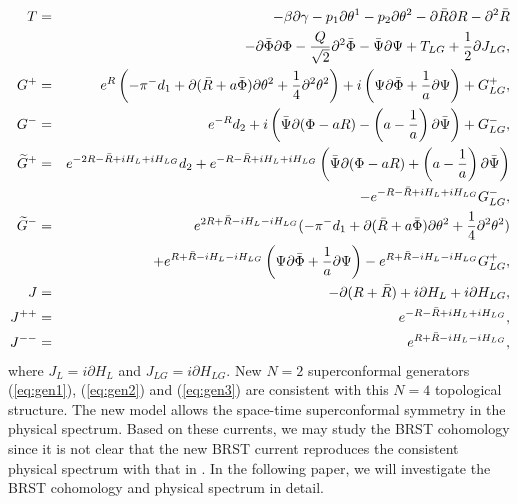 \documentclass[a4paper,12pt]{article}
\begin{document}
\begin{eqnarray}
T
&=&-\beta\partial\gamma-p_1\partial\theta^1
-p_2\partial\theta^2-\partial\bar R\partial R
-\partial^2\bar R \nonumber\\
&&\hspace{10mm}
-\partial\bar\Phi\partial\Phi
-\frac{Q}{\sqrt{2}}\partial^2\bar\Phi
-\bar\Psi\partial\Psi+T_{LG}+\frac{1}{2}\partial J_{LG},\nonumber\\
G^+&=&
e^R\left(
-\pi^-d_1+\partial(\bar R+a\bar\Phi)\partial\theta^2
+\frac{1}{4}\partial^2\theta^2\right)
+i\left(\Psi
\partial\bar\Phi+\frac{1}{a}\partial\Psi\right)+G^+_{LG},
\nonumber\\
G^-&=&
e^{-R}d_2+i\left(\bar\Psi\partial(\Phi-aR)
-\left(a-\frac{1}{a}\right)\partial\bar\Psi\right)+G^-_{LG},
\nonumber\\
\widetilde G^+&=&
e^{-2R-\bar R+i H_{L}+i H_{LG}}d_2
+e^{-R-\bar R+i H_{L}+i H_{LG}}\left(\bar{\Psi}\partial(\Phi-aR)
+\left(a-\frac{1}{a}\right)\partial\bar{\Psi}\right)\nonumber\\
&&\hspace{20mm}
-e^{-R-\bar R+i H_{L}+i H_{LG}} G^{-}_{LG}, \nonumber\\
\widetilde G^-&=&
e^{2R+\bar R-i H_{L}-i H_{LG}}(-\pi^-d_1
+\partial(\bar R+a\bar\Phi)\partial\theta^2
+\frac{1}{4}\partial^2\theta^2)\nonumber\\
&&\hspace{10mm}
+e^{R+\bar R-i H_{L}-i H_{LG}}
\left(\Psi\partial\bar\Phi+\frac{1}{a}\partial\Psi\right)
-e^{R+\bar R-i H_{L}- i H_{LG}} G^{+}_{LG},\nonumber\\
J&=&-\partial(R+\bar R)+i \partial H_{L}+i\partial H_{LG},\nonumber\\
J^{++}&=&e^{-R-\bar R+i H_{L}+ i H_{LG}},\nonumber\\
J^{--}&=&e^{R+\bar R-i H_{L}-i H_{LG}},
\end{eqnarray}
where $J_{L}=i\partial H_{L}$ and $J_{LG}=i\partial H_{LG}$.
New $N=2$ superconformal generators (\ref{eq:gen1}), (\ref{eq:gen2}) 
and (\ref{eq:gen3}) are  consistent
with this $N=4$ topological structure. The new model allows
the space-time superconformal symmetry in the physical spectrum.
Based on these currents, we may study the BRST cohomology since
it is not clear that the new BRST current reproduces the consistent
physical spectrum with that in \cite{GKP}.
In the following paper\cite{ItKu}, 
we will investigate the BRST cohomology and
physical spectrum in detail.
\end{document}
